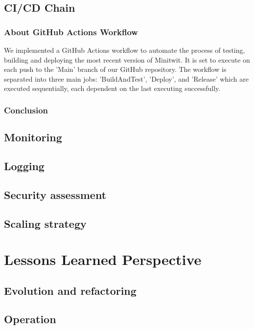 \documentclass[12pt, a4paper, oneside]{book}
\begin{document}
\section{CI/CD Chain}

\subsection{About GitHub Actions Workflow}
We implemented a GitHub Actions workflow to automate the process of testing, building and deploying the most recent version of Minitwit. It is set to execute on each push to the 'Main' branch of our GitHub repository. The workflow is separated into three main jobs: 'BuildAndTest', 'Deploy', and 'Release' which are executed sequentially, each dependent on the last executing successfully.



\subsection{Conclusion}


\section{Monitoring}

\section{Logging}

\section{Security assessment}

\section{Scaling strategy}

\chapter{Lessons Learned Perspective}

\section{Evolution and refactoring}

\section{Operation}
\end{document}
